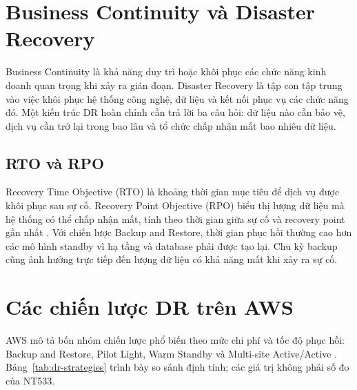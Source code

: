 \section{Business Continuity và Disaster Recovery}

Business Continuity là khả năng duy trì hoặc khôi phục các chức năng kinh doanh quan trọng khi xảy ra gián đoạn. Disaster Recovery là tập con tập trung vào việc khôi phục hệ thống công nghệ, dữ liệu và kết nối phục vụ các chức năng đó. Một kiến trúc DR hoàn chỉnh cần trả lời ba câu hỏi: dữ liệu nào cần bảo vệ, dịch vụ cần trở lại trong bao lâu và tổ chức chấp nhận mất bao nhiêu dữ liệu.

\subsection{RTO và RPO}

Recovery Time Objective (RTO) là khoảng thời gian mục tiêu để dịch vụ được khôi phục sau sự cố. Recovery Point Objective (RPO) biểu thị lượng dữ liệu mà hệ thống có thể chấp nhận mất, tính theo thời gian giữa sự cố và recovery point gần nhất \cite{aws-dr-objectives}. Với chiến lược Backup and Restore, thời gian phục hồi thường cao hơn các mô hình standby vì hạ tầng và database phải được tạo lại. Chu kỳ backup cũng ảnh hưởng trực tiếp đến lượng dữ liệu có khả năng mất khi xảy ra sự cố.

\section{Các chiến lược DR trên AWS}

AWS mô tả bốn nhóm chiến lược phổ biến theo mức chi phí và tốc độ phục hồi: Backup and Restore, Pilot Light, Warm Standby và Multi-site Active/Active \cite{aws-dr-options}. Bảng~\ref{tab:dr-strategies} trình bày so sánh định tính; các giá trị không phải số đo của NT533.

